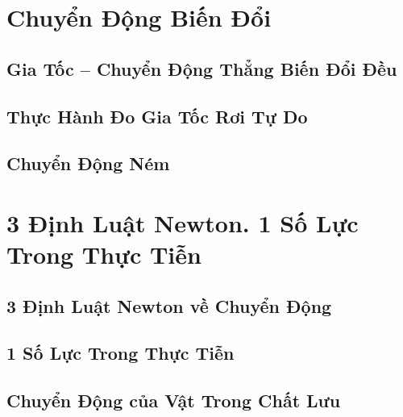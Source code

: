 \documentclass[oneside]{book}
\numberwithin{equation}{section}
\begin{document}

\chapter{Chuyển Động Biến Đổi}

\section{Gia Tốc -- Chuyển Động Thẳng Biến Đổi Đều}


\section{Thực Hành Đo Gia Tốc Rơi Tự Do}


\section{Chuyển Động Ném}


\chapter{3 Định Luật Newton. 1 Số Lực Trong Thực Tiễn}

\section{3 Định Luật Newton về Chuyển Động}


\section{1 Số Lực Trong Thực Tiễn}


\section{Chuyển Động của Vật Trong Chất Lưu}
\end{document}
